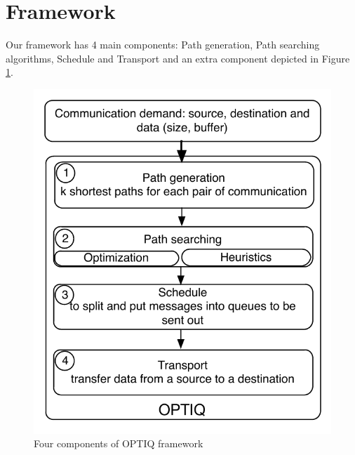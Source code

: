 \section{Framework}
\label{sec:framework}

Our framework has 4 main components: Path generation, Path searching algorithms, Schedule and Transport and an extra component depicted in Figure \ref{fig:framework}.

\begin{figure}[!htb]
\vspace{-0.1in}
\centering
\includegraphics[scale=0.7]{figures/framework.pdf}
\vspace{-0.1in}
\caption{Four components of OPTIQ framework}
\vspace{-0.1in}
\label{fig:framework}
\end{figure}

